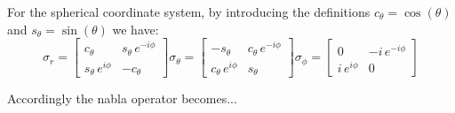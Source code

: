 For the spherical coordinate system, by introducing the definitions $c_{\theta}= \cos(\theta)$  and $s_{\theta}= \sin(\theta)$ we have:
%
\begin{subequations}
\label{eqn:pauliRepresentationsp:1}
\begin{equation}\label{eqn:pauliRepresentation:sph1}
\sigma_{r} =
\begin{bmatrix}
c_{\theta} & s_{\theta} \, e^{-i\phi} \\
s_{\theta}\,e^{i\phi} & -c_{\theta} \end{bmatrix}
\end{equation}
%
\begin{equation}\label{eqn:pauliRepresentation:sph2}
\sigma_{\theta}
=
\begin{bmatrix}
-s_{\theta} &  c_{\theta} \, e^{-i\phi} \\
c_{\theta} \,e^{i\phi} & s_{\theta}
\end{bmatrix}
\end{equation}
%
\begin{equation}\label{eqn:pauliRepresentation:sph3}
\sigma_{\phi}
=
\begin{bmatrix}
0 & - i \, e^{-i\phi} \\
i \,e^{i\phi} & 0
\end{bmatrix}
\end{equation}
%
\end{subequations}

Accordingly the nabla operator becomes...
